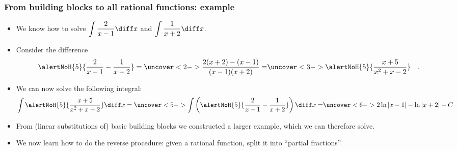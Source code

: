 \begin{frame}
\frametitle{From building blocks to all rational functions: example}
\begin{itemize}
\item We know how to solve $\displaystyle \int \frac{2}{x-1}\diff x$ and $\displaystyle \int \frac{1}{x+2}\diff x$.
\item Consider the difference
\[
\alertNoH{5}{\frac{2}{x-1} - \frac{1}{x+2} } = %
\uncover<2->{%
\frac{2(x+2) - (x-1)}{(x-1)(x+2)} = %
}%
\uncover<3->{%
\alertNoH{5}{ \frac{x + 5}{x^2+x-2} }\quad .
}%
\]
\item<4->

We can now solve the following integral:
\[
\int \alertNoH{5}{ \frac{x+5}{x^2+x-2}}\diff x = %
\uncover<5->{%
\int \left(\alertNoH{5}{\frac{2}{x-1} - \frac{1}{x+2}} \right) \diff x = %
}%
\uncover<6->{%
2\ln | x - 1| - \ln | x + 2| + C
}%
\]
\item<7-> From  (linear substitutions of) basic building blocks we constructed a larger example, which we can therefore solve.
\item<8-> We now learn how to do the reverse procedure: given a rational function, split it into ``partial fractions''.
\end{itemize}
\end{frame}
